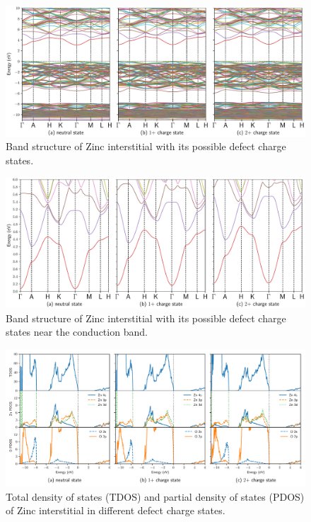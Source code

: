 \begin{figure}[tbph!]
	\centering
	\includegraphics[width=1\textwidth]{"images/rnd/Zn_i-band"}
	\caption[Band structure of Zinc interstitial with its possible defect charge states]{Band structure of Zinc interstitial with its possible defect charge states. }
	\label{fig:band-Zn_i}
\end{figure}

\begin{figure}[tbph!]
	\centering
	\includegraphics[width=1\textwidth]{"images/rnd/Zn_i-bandclose"}
	\caption[Band structure of Zinc interstitial with its possible defect charge states near the conduction band]{Band structure of Zinc interstitial with its possible defect charge states near the conduction band. }
	\label{fig:bandclose-Zn_i}
\end{figure}

\begin{figure}[t!]
	\centering
	\includegraphics[width=1\textwidth]{"images/rnd/Zn_i-dos"}
	\caption[Total density of states (TDOS) and partial density of states (PDOS) of Zinc interstitial in different  defect charge states]{Total density of states (TDOS) and partial density of states (PDOS) of Zinc interstitial in different  defect charge states.}
	\label{fig:dos-Zn_i}
\end{figure}

